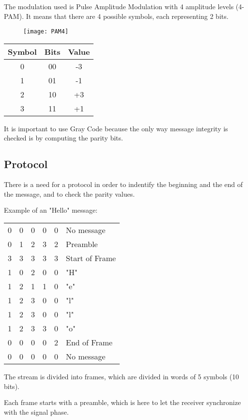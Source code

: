 \documentclass[12pt]{report}
\begin{document}
The modulation used is Pulse Amplitude Modulation with 4 amplitude levels (4-PAM).
It means that there are 4 possible symbols, each representing 2 bits.

\begin{figure}[h]
\centering
\texttt{[image: PAM4]}
\end{figure}

\begin{center}
\begin{tabular}{c|c|c}
Symbol&Bits&Value\\
\hline
0&00&-3\\
1&01&-1\\
2&10&+3\\
3&11&+1\\
\end{tabular}
\end{center}

It is important to use Gray Code because the only way message integrity is checked is by computing the parity bits.

\subsection{Protocol}

There is a need for a protocol in order to indentify the beginning and the end of the message, and to check the parity values.

Example of an "Hello" message:

\begin{center}
\begin{tabular}{ccccc|l}
0&0&0&0&0&No message\\
0&1&2&3&2&Preamble\\
3&3&3&3&3&Start of Frame\\
1&0&2&0&0&"H"\\
1&2&1&1&0&"e"\\
1&2&3&0&0&"l"\\
1&2&3&0&0&"l"\\
1&2&3&3&0&"o"\\
0&0&0&0&2&End of Frame\\
0&0&0&0&0&No message\\
\end{tabular}
\end{center}

The stream is divided into frames, which are divided in words of 5 symbols (10 bits).

 Each frame starts with a preamble, which is here to let the receiver synchronize with the signal phase.
\end{document}
